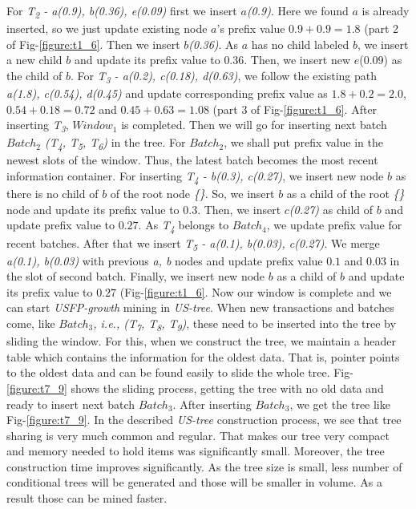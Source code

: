 \documentclass[conference]{IEEEtran}
\begin{document}
For \emph{T\textsubscript{2} - a(0.9), b(0.36), e(0.09)} first we insert \emph{$a$(0.9)}. Here we found \emph{$a$} is already inserted, so we just update existing node $a$'s prefix value $0.9 + 0.9 = 1.8$ (part 2 of Fig-\ref{figure:t1_6}. Then we insert \emph{$b$(0.36)}. As \emph{$a$} has no child labeled \emph{$b$}, we insert a new child $b$ and update its prefix value to $0.36$. Then, we insert new $e$(0.09) as the child of \emph{$b$}. For \emph{T\textsubscript{3} - a(0.2), c(0.18), d(0.63)}, we follow the existing path \emph{a(1.8), c(0.54), d(0.45)} and update corresponding prefix value as $1.8 + 0.2 = 2.0$, $0.54 + 0.18 = 0.72$ and $0.45 + 0.63 = 1.08$ (part 3 of Fig-\ref{figure:t1_6}. After inserting \emph{T\textsubscript{3}}, $Window_{1}$ is completed. Then we will go for inserting next batch \emph{$Batch_2$ (T\textsubscript{4}, T\textsubscript{5}, T\textsubscript{6})} in the tree. For \emph{$Batch_{2}$}, we shall put prefix value in the newest slots of the window. Thus, the latest batch becomes the most recent information container. For inserting \emph{T\textsubscript{4} - b(0.3), c(0.27)}, we insert new node \emph{$b$} as there is no child of $b$ of the root node \emph{\{\}}. So, we insert \emph{$b$} as a child of the root \emph{\{\}} node and update its prefix value to $0.3$. Then, we insert \emph{$c$(0.27)} as child of \emph{$b$} and update prefix value to $0.27$. As \emph{T\textsubscript{4}} belongs to \emph{$Batch_{4}$}, we update prefix value for recent batches. After that we insert \emph{T\textsubscript{5} - a(0.1), b(0.03), c(0.27)}. We merge \emph{a(0.1), b(0.03)} with previous \emph{a, b } nodes and update prefix value $0.1$ and $0.03$ in the slot of second batch. Finally, we insert new node \emph{$b$} as a child of \emph{$b$} and update its prefix value to $0.27$ (Fig-\ref{figure:t1_6}.
Now our window is complete and we can start \emph{USFP-growth} mining in \emph {US-tree}. When new transactions and batches come, like \emph{$Batch_{3}$, i.e., (T\textsubscript{7}, T\textsubscript{8}, T\textsubscript{9})}, these need to be inserted into the tree by sliding the window. For this, when we construct the tree, we maintain a header table which contains the information for the oldest data. That is, pointer points to the oldest data and can be found easily to slide the whole tree. Fig-\ref{figure:t7_9} shows the sliding process, getting the tree with no old data and ready to insert next batch \emph{$Batch_{3}$}. After inserting \emph{$Batch_{3}$}, we get the tree like Fig-\ref{figure:t7_9}.
In the described \emph{US-tree} construction process, we see that tree sharing is very much common and regular. That makes our tree very compact and memory needed to hold items was significantly small. Moreover, the tree construction time improves significantly. As the tree size is small, less number of conditional trees will be generated and those will be smaller in volume. As a result those can be mined faster.
\end{document}
